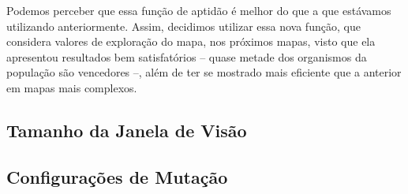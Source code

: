 Podemos perceber que essa função de aptidão é melhor do que a que estávamos
utilizando anteriormente. Assim, decidimos utilizar essa nova função, que
considera valores de exploração do mapa, nos próximos mapas, visto que ela
apresentou resultados bem satisfatórios -- quase metade dos organismos da
população são vencedores --, além de ter se mostrado mais eficiente que a
anterior em mapas mais complexos.

\subsection{Tamanho da Janela de Visão}


\subsection{Configurações de Mutação}

